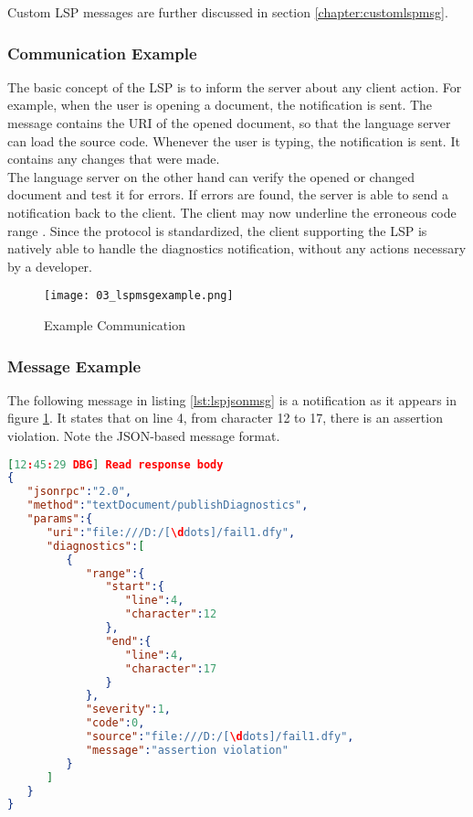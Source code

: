 Custom LSP messages are further discussed in section \ref{chapter:customlspmsg}.

\subsubsection{Communication Example}
The basic concept of the LSP is to inform the server about any client action.
For example, when the user is opening a document, the notification  is sent.
The message contains the URI of the opened document, so that the language server can load the source code.
Whenever the user is typing, the notification  is sent.
It contains any changes that were made.\\

The language server on the other hand can verify the opened or changed document and test it for errors.
If errors are found, the server is able to send a  notification back to the client.
The client may now underline the erroneous code range \cite{lspspec}.
Since the protocol is standardized, the client supporting the LSP is natively able to handle the diagnostics notification, without any actions necessary by a developer.

\begin{figure}[H]
    \centering
    \texttt{[image: 03\_lspmsgexample.png]}
    \caption{Example Communication}
    \label{fig:lspmsgexample}
\end{figure}

\subsubsection{Message Example}
The following message in listing \ref{lst:lspjsonmsg} is a  notification as it appears in figure \ref{fig:lspmsgexample}.
It states that on line 4, from character 12 to 17, there is an assertion violation.
Note the JSON-based message format.\\

\begin{lstlisting}[language=json, caption={LSP Message Example}, captionpos=b, label={lst:lspjsonmsg}]
[12:45:29 DBG] Read response body
{
   "jsonrpc":"2.0",
   "method":"textDocument/publishDiagnostics",
   "params":{
      "uri":"file:///D:/[\ddots]/fail1.dfy",
      "diagnostics":[
         {
            "range":{
               "start":{
                  "line":4,
                  "character":12
               },
               "end":{
                  "line":4,
                  "character":17
               }
            },
            "severity":1,
            "code":0,
            "source":"file:///D:/[\ddots]/fail1.dfy",
            "message":"assertion violation"
         }
      ]
   }
}
\end{lstlisting}

